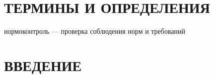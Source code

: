 \section*{ТЕРМИНЫ И ОПРЕДЕЛЕНИЯ} %

нормоконтроль — проверка соблюдения норм и требований

\section*{ВВЕДЕНИЕ}

